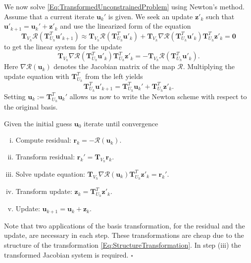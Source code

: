 We now solve \eqref{Eq:TransformedUnconstrainedProblem} using Newton's
method. Assume that a current iterate $\mathbf{u}_k'$ is given. We
seek an update $\mathbf{z}'_k$ such that $\mathbf{u}'_{k+1} = \mathbf{u}_k'
+ \mathbf{z}'_k$ and use the linearized form of the equation
\begin{equation*}
\mathbf{T}_{V_h}\mathcal{R}\left(\mathbf{T}^T_{U_h}\mathbf{u}'_{k+1}\right) \approx 
\mathbf{T}_{V_h}\mathcal{R}\left(\mathbf{T}^T_{U_h}\mathbf{u}'_{k}\right) +
\mathbf{T}_{V_h}\nabla\mathcal{R}\left(\mathbf{T}^T_{U_h}\mathbf{u}'_{k}\right) 
\mathbf{T}^T_{U_h} \mathbf{z}'_{k} = \mathbf{0}
\end{equation*}
to get the linear system for the update
\begin{equation}\label{eq:UnconstrainedUpdate}
\mathbf{T}_{V_h}\nabla\mathcal{R}\left(\mathbf{T}^T_{U_h}\mathbf{u}'_{k}\right) 
\mathbf{T}^T_{U_h} \mathbf{z}'_{k} = -
\mathbf{T}_{V_h}\mathcal{R}\left(\mathbf{T}^T_{U_h}\mathbf{u}'_{k}\right) .
\end{equation}
Here $\nabla\mathcal{R}\left(\mathbf{u}_{k}\right)$ denotes the
Jacobian matrix of the map $\mathcal{R}$. Multiplying the update
equation with $\mathbf{T}^T_{U_h}$ from the left yields
\begin{equation}\label{eq:OriginalUpdate}
\mathbf{T}^T_{U_h}\mathbf{u}'_{k+1} = \mathbf{T}^T_{U_h}\mathbf{u}_k' +
\mathbf{T}^T_{U_h}\mathbf{z}'_k .
\end{equation}
Setting $\mathbf{u}_{k} := \mathbf{T}^T_{U_h}\mathbf{u}_k'$ allows us
now to write the Newton scheme with respect to the original basis.

\begin{algo}
Given the initial guess $\mathbf{u}_{0}$ iterate until convergence
\begin{enumerate}[i)]
\item Compute residual:
  $\mathbf{r}_k=-\mathcal{R}\left(\mathbf{u}_{k}\right)$.
\item Transform residual: $\mathbf{r}_k' = \mathbf{T}_{V_h}
  \mathbf{r}_k$.
\item Solve update equation:
  $\mathbf{T}_{V_h}\nabla\mathcal{R}\left(\mathbf{u}_{k}\right)  
\mathbf{T}^T_{U_h} \mathbf{z}'_{k} =  \mathbf{r}_k'$.
\item Transform update: $\mathbf{z}_{k} =
  \mathbf{T}^T_{U_h}\mathbf{z}'_k$.
\item Update: $\mathbf{u}_{k+1} = \mathbf{u}_k
+ \mathbf{z}_k$.
\end{enumerate}
Note that two applications of the basis transformation, for the
residual and the update, are necessary in each step. These
transformations are cheap due to the structure of the transformation
\eqref{Eq:StructureTransformation}. In step (iii) the transformed
Jacobian system is required. \hfill$\square$
\end{algo}

